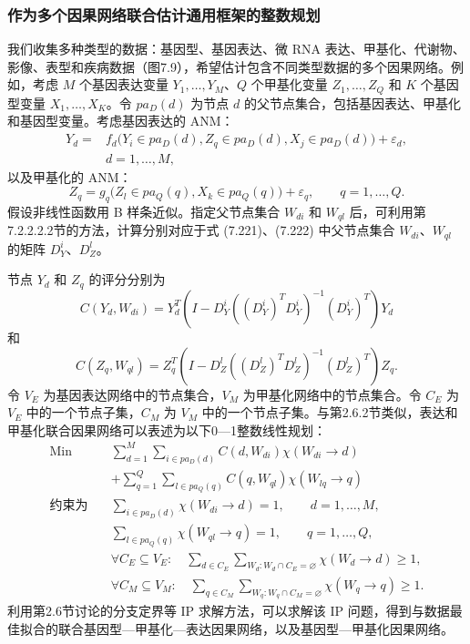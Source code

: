 \subsubsection{作为多个因果网络联合估计通用框架的整数规划}

我们收集多种类型的数据：基因型、基因表达、微 RNA 表达、甲基化、代谢物、影像、表型和疾病数据（图7.9），希望估计包含不同类型数据的多个因果网络。例如，考虑 $M$ 个基因表达变量 $Y_1,\ldots,Y_M$、$Q$ 个甲基化变量 $Z_1,\ldots,Z_Q$ 和 $K$ 个基因型变量 $X_1,\ldots,X_K$。令 $pa_D(d)$ 为节点 $d$ 的父节点集合，包括基因表达、甲基化和基因型变量。考虑基因表达的 ANM：
\begin{equation}
\begin{aligned}
Y_d={}&f_d\bigl(Y_i\in pa_D(d),Z_q\in pa_D(d),X_j\in pa_D(d)\bigr)+\varepsilon_d,\\
&d=1,\ldots,M,
\end{aligned}
\tag{7.221}
\end{equation}
以及甲基化的 ANM：
\begin{equation}
Z_q=g_q\bigl(Z_l\in pa_Q(q),X_k\in pa_Q(q)\bigr)+\varepsilon_q,\qquad q=1,\ldots,Q.
\tag{7.222}
\end{equation}
假设非线性函数用 B 样条近似。指定父节点集合 $W_{di}$ 和 $W_{ql}$ 后，可利用第7.2.2.2.2节的方法，计算分别对应于式 (7.221)、(7.222) 中父节点集合 $W_{di}$、$W_{ql}$ 的矩阵 $D_Y^i$、$D_Z^l$。

节点 $Y_d$ 和 $Z_q$ 的评分分别为
\begin{equation}
C(Y_d,W_{di})=Y_d^T\left(I-D_Y^i\left((D_Y^i)^TD_Y^i\right)^{-1}(D_Y^i)^T\right)Y_d
\tag{7.223}
\end{equation}
和
\begin{equation}
C(Z_q,W_{ql})=Z_q^T\left(I-D_Z^l\left((D_Z^l)^TD_Z^l\right)^{-1}(D_Z^l)^T\right)Z_q.
\tag{7.224}
\end{equation}
令 $V_E$ 为基因表达网络中的节点集合，$V_M$ 为甲基化网络中的节点集合。令 $C_E$ 为 $V_E$ 中的一个节点子集，$C_M$ 为 $V_M$ 中的一个节点子集。与第2.6.2节类似，表达和甲基化联合因果网络可以表述为以下0—1整数线性规划：
\begin{equation}
\begin{aligned}
\operatorname{Min}\quad&\sum_{d=1}^{M}\sum_{i\in pa_D(d)}C(d,W_{di})\chi(W_{di}\to d)\\
&+\sum_{q=1}^{Q}\sum_{l\in pa_Q(q)}C(q,W_{ql})\chi(W_{lq}\to q)\\
\text{约束为}\quad&\sum_{i\in pa_D(d)}\chi(W_{di}\to d)=1,\qquad d=1,\ldots,M,\\
&\sum_{l\in pa_Q(q)}\chi(W_{ql}\to q)=1,\qquad q=1,\ldots,Q,\\
&\forall C_E\subseteq V_E:\quad
\sum_{d\in C_E}\sum_{W_d:W_d\cap C_E=\varnothing}\chi(W_d\to d)\ge1,\\
&\forall C_M\subseteq V_M:\quad
\sum_{q\in C_M}\sum_{W_q:W_q\cap C_M=\varnothing}\chi(W_q\to q)\ge1.
\end{aligned}
\tag{7.225}
\end{equation}
利用第2.6节讨论的分支定界等 IP 求解方法，可以求解该 IP 问题，得到与数据最佳拟合的联合基因型—甲基化—表达因果网络，以及基因型—甲基化因果网络。
